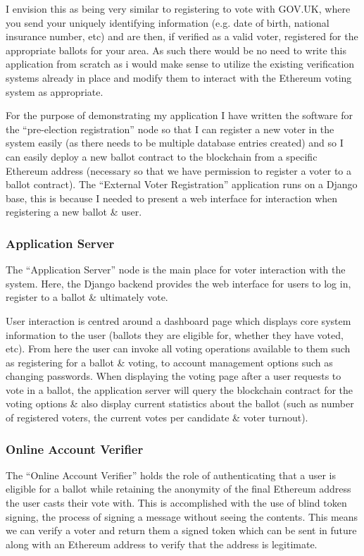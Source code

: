 \documentclass{article}
\begin{document}
I envision this as being very similar to registering to vote with GOV.UK, where you send your uniquely identifying information (e.g. date of birth, national insurance number, etc) and are then, if verified as a valid voter, registered for the appropriate ballots for your area. As such there would be no need to write this application from scratch as i would make sense to utilize the existing verification systems already in place and modify them to interact with the Ethereum voting system as appropriate. 

For the purpose of demonstrating my application I have written the software for the ``pre-election registration'' node so that I can register a new voter in the system easily (as there needs to be multiple database entries created) and so I can easily deploy a new ballot contract to the blockchain from a specific Ethereum address (necessary so that we have permission to register a voter to a ballot contract). The ``External Voter Registration'' application runs on a Django base, this is because I needed to present a web interface for interaction when registering a new ballot \& user.

\subsubsection{Application Server}
The ``Application Server'' node is the main place for voter interaction with the system. Here, the Django backend provides the web interface for users to log in, register to a ballot \& ultimately vote.

User interaction is centred around a dashboard page which displays core system information to the user (ballots they are eligible for, whether they have voted, etc). From here the user can invoke all voting operations available to them such as registering for a ballot \& voting, to account management options such as changing passwords. When displaying the voting page after a user requests to vote in a ballot, the application server will query the blockchain contract for the voting options \& also display current statistics about the ballot (such as number of registered voters, the current votes per candidate \& voter turnout).

\subsubsection{Online Account Verifier}
The ``Online Account Verifier'' holds the role of authenticating that a user is eligible for a ballot while retaining the anonymity of the final Ethereum address the user casts their vote with. This is accomplished with the use of blind token signing, the process of signing a message without seeing the contents. This means we can verify a voter and return them a signed token which can be sent in future along with an Ethereum address to verify that the address is legitimate. 
\end{document}
